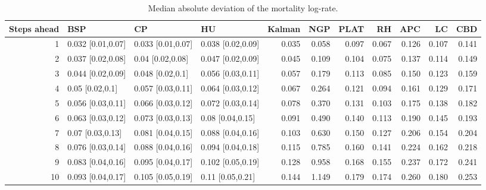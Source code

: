 % 
\begin{table}[ht]
\centering
\begin{tabular}{rlllrrrrrrr}
  \hline
Steps ahead & BSP & CP & HU & Kalman & NGP & PLAT & RH & APC & LC & CBD \\ 
  \hline
   1 & 0.032 [0.01,0.07] & 0.033 [0.01,0.07] & 0.038 [0.02,0.09] & 0.035 & 0.058 & 0.097 & 0.067 & 0.126 & 0.107 & 0.141 \\ 
     2 & 0.037 [0.02,0.08] & 0.04 [0.02,0.08] & 0.047 [0.02,0.09] & 0.045 & 0.109 & 0.104 & 0.075 & 0.137 & 0.114 & 0.149 \\ 
     3 & 0.044 [0.02,0.09] & 0.048 [0.02,0.1] & 0.056 [0.03,0.11] & 0.057 & 0.179 & 0.113 & 0.085 & 0.150 & 0.123 & 0.159 \\ 
     4 & 0.05 [0.02,0.1] & 0.057 [0.03,0.11] & 0.064 [0.03,0.12] & 0.067 & 0.264 & 0.121 & 0.094 & 0.161 & 0.129 & 0.171 \\ 
     5 & 0.056 [0.03,0.11] & 0.066 [0.03,0.12] & 0.072 [0.03,0.14] & 0.078 & 0.370 & 0.131 & 0.103 & 0.175 & 0.138 & 0.182 \\ 
     6 & 0.063 [0.03,0.12] & 0.073 [0.03,0.13] & 0.08 [0.04,0.15] & 0.091 & 0.490 & 0.140 & 0.113 & 0.190 & 0.145 & 0.193 \\ 
     7 & 0.07 [0.03,0.13] & 0.081 [0.04,0.15] & 0.088 [0.04,0.16] & 0.103 & 0.630 & 0.150 & 0.127 & 0.206 & 0.154 & 0.204 \\ 
     8 & 0.076 [0.03,0.14] & 0.088 [0.04,0.16] & 0.094 [0.04,0.18] & 0.115 & 0.785 & 0.160 & 0.141 & 0.224 & 0.162 & 0.218 \\ 
     9 & 0.083 [0.04,0.16] & 0.095 [0.04,0.17] & 0.102 [0.05,0.19] & 0.128 & 0.958 & 0.168 & 0.155 & 0.237 & 0.172 & 0.241 \\ 
    10 & 0.093 [0.04,0.17] & 0.105 [0.05,0.19] & 0.11 [0.05,0.21] & 0.144 & 1.149 & 0.179 & 0.174 & 0.260 & 0.180 & 0.253 \\ 
   \hline
\end{tabular}
\caption{Median absolute deviation of the mortality log-rate.} 
\end{table}
